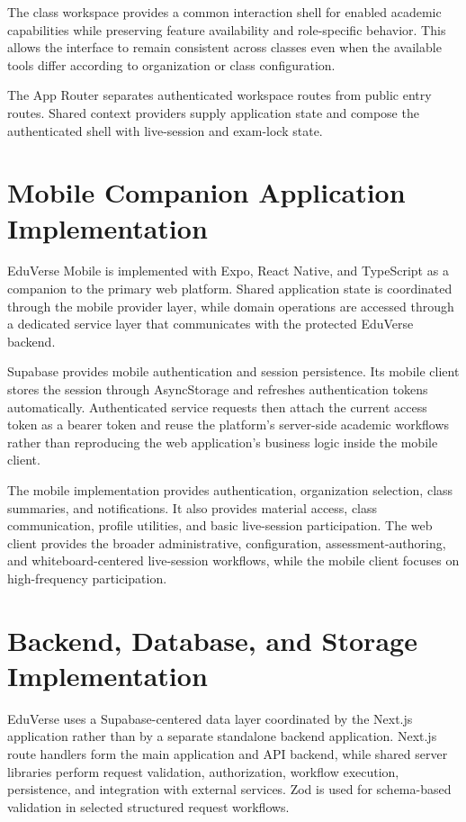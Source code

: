The class workspace provides a common interaction shell for enabled academic
capabilities while preserving feature availability and role-specific behavior.
This allows the interface to remain consistent across classes even when the
available tools differ according to organization or class configuration.

The App Router separates authenticated workspace routes from public entry
routes. Shared context providers supply application state and compose the
authenticated shell with live-session and exam-lock state.

\section{Mobile Companion Application Implementation}
\label{sec:mobile_companion_application_implementation}

EduVerse Mobile is implemented with Expo, React Native, and TypeScript as a
companion to the primary web platform. Shared application state is coordinated
through the mobile provider layer, while domain operations are accessed through
a dedicated service layer that communicates with the protected EduVerse
backend.

Supabase provides mobile authentication and session persistence. Its mobile
client stores the session through AsyncStorage and refreshes authentication
tokens automatically. Authenticated service requests then attach the current
access token as a bearer token and reuse the platform's server-side academic
workflows rather than reproducing the web application's business logic inside
the mobile client.

The mobile implementation provides authentication, organization selection,
class summaries, and notifications. It also provides material access, class
communication, profile utilities, and basic live-session participation. The
web client provides the broader administrative, configuration,
assessment-authoring, and whiteboard-centered live-session workflows, while the
mobile client focuses on high-frequency participation.

\section{Backend, Database, and Storage Implementation}
\label{sec:backend_database_storage_implementation}

EduVerse uses a Supabase-centered data layer coordinated by the Next.js
application rather than by a separate standalone backend application. Next.js
route handlers form the main application and API backend, while shared server
libraries perform request validation, authorization, workflow execution,
persistence, and integration with external services. Zod is used for
schema-based validation in selected structured request workflows.

